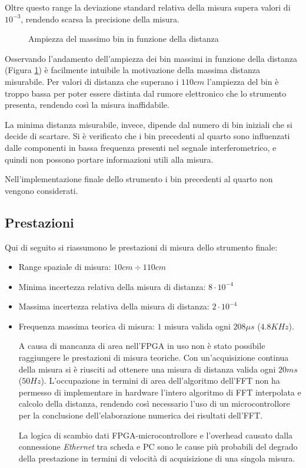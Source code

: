 Oltre questo range la deviazione standard relativa della misura supera valori di $10^{-3}$, rendendo scarsa la precisione della misura.
\begin{figure}
\centering
{}
\hspace{5mm}
\caption{Ampiezza del massimo bin in funzione della distanza}\label{ampbin}
\end{figure}

Osservando l'andamento dell'ampiezza dei bin massimi in funzione della distanza (Figura \ref{ampbin}) è facilmente intuibile la motivazione della massima distanza misurabile. Per valori di distanza che superano i $110cm$ l'ampiezza del bin è troppo bassa per poter essere distinta dal rumore elettronico che lo strumento presenta, rendendo così la misura inaffidabile.

La minima distanza misurabile, invece, dipende dal numero di bin iniziali che si decide di scartare. Si è verificato che i bin precedenti al quarto sono influenzati dalle componenti in bassa frequenza presenti nel segnale interferometrico, e quindi non possono portare informazioni utili alla misura.

Nell'implementazione finale dello strumento i bin precedenti al quarto non vengono considerati.

\subsection{Prestazioni}
Qui di seguito si riassumono le prestazioni di misura dello strumento finale:
\begin{itemize}
	\item Range spaziale di misura: $10cm \div 110cm$
	\item Minima incertezza relativa della misura di distanza: $8 \cdot 10^{-4}$
	\item Massima incertezza relativa della misura di distanza: $2 \cdot 10^{-4}$
	\item Frequenza massima teorica di misura: $1$ misura valida ogni $208 \mu s$ ($4.8 KHz$).
	
	A causa di mancanza di area nell'FPGA in uso non è stato possibile raggiungere le prestazioni di misura teoriche. Con un'acquisizione continua della misura si è riusciti ad ottenere una misura di distanza valida ogni $20 ms$ ($50 Hz$). L'occupazione in termini di area dell'algoritmo dell'FFT non ha permesso di implementare in hardware l'intero algoritmo di FFT interpolata e calcolo della distanza, rendendo così necessario l'uso di un microcontrollore per la conclusione dell'elaborazione numerica dei risultati dell'FFT.
	
	La logica di scambio dati FPGA-microcontrollore e l'overhead causato dalla connessione \textit{Ethernet} tra scheda e PC sono le cause più probabili del degrado della prestazione in termini di velocità di acquisizione di una singola misura.
\end{itemize}

